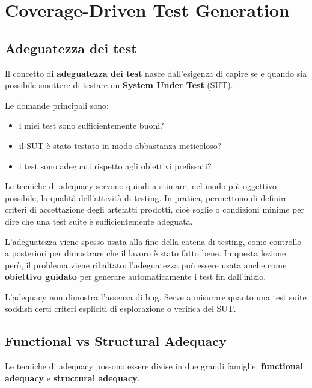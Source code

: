 \chapter{Coverage-Driven Test Generation}

\section{Adeguatezza dei test}

Il concetto di \textbf{adeguatezza dei test} nasce dall'esigenza di capire se e quando sia possibile smettere di testare un \textbf{System Under Test} (SUT).

Le domande principali sono:

\begin{itemize}
    \item i miei test sono sufficientemente buoni?
    \item il SUT è stato testato in modo abbastanza meticoloso?
    \item i test sono adeguati rispetto agli obiettivi prefissati?
\end{itemize}

Le tecniche di adequacy servono quindi a stimare, nel modo più oggettivo possibile, la qualità dell'attività di testing. In pratica, permettono di definire criteri di accettazione degli artefatti prodotti, cioè soglie o condizioni minime per dire che una test suite è sufficientemente adeguata.

\begin{notaprof}
L'adeguatezza viene spesso usata alla fine della catena di testing, come controllo a posteriori per dimostrare che il lavoro è stato fatto bene. In questa lezione, però, il problema viene ribaltato: l'adeguatezza può essere usata anche come \textbf{obiettivo guidato} per generare automaticamente i test fin dall'inizio.
\end{notaprof}

\begin{notaesame}
L'adequacy non dimostra l'assenza di bug. Serve a misurare quanto una test suite soddisfi certi criteri espliciti di esplorazione o verifica del SUT.
\end{notaesame}

\section{Functional vs Structural Adequacy}

Le tecniche di adequacy possono essere divise in due grandi famiglie: \textbf{functional adequacy} e \textbf{structural adequacy}.

